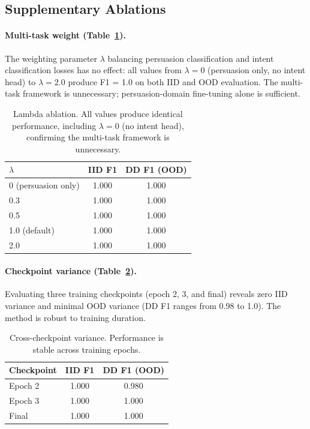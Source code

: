 \documentclass[11pt]{article}
\begin{document}
\subsection{Supplementary Ablations}

\paragraph{Multi-task weight (Table~\ref{tab:lambda}).}
The weighting parameter $\lambda$ balancing persuasion classification and intent classification losses has no effect: all values from $\lambda = 0$ (persuasion only, no intent head) to $\lambda = 2.0$ produce F1 = 1.0 on both IID and OOD evaluation. The multi-task framework is unnecessary; persuasion-domain fine-tuning alone is sufficient.

\begin{table}[t]
\centering
\caption{Lambda ablation. All values produce identical performance, including $\lambda = 0$ (no intent head), confirming the multi-task framework is unnecessary.}
\label{tab:lambda}
\begin{tabular}{lcc}
\toprule
\textbf{$\lambda$} & \textbf{IID F1} & \textbf{DD F1 (OOD)} \\
\midrule
0 (persuasion only) & 1.000 & 1.000 \\
0.3 & 1.000 & 1.000 \\
0.5 & 1.000 & 1.000 \\
1.0 (default) & 1.000 & 1.000 \\
2.0 & 1.000 & 1.000 \\
\bottomrule
\end{tabular}
\end{table}

\paragraph{Checkpoint variance (Table~\ref{tab:checkpoint}).}
Evaluating three training checkpoints (epoch 2, 3, and final) reveals zero IID variance and minimal OOD variance (DD F1 ranges from 0.98 to 1.0). The method is robust to training duration.

\begin{table}[t]
\centering
\caption{Cross-checkpoint variance. Performance is stable across training epochs.}
\label{tab:checkpoint}
\begin{tabular}{lcc}
\toprule
\textbf{Checkpoint} & \textbf{IID F1} & \textbf{DD F1 (OOD)} \\
\midrule
Epoch 2 & 1.000 & 0.980 \\
Epoch 3 & 1.000 & 1.000 \\
Final & 1.000 & 1.000 \\
\bottomrule
\end{tabular}
\end{table}
\end{document}
